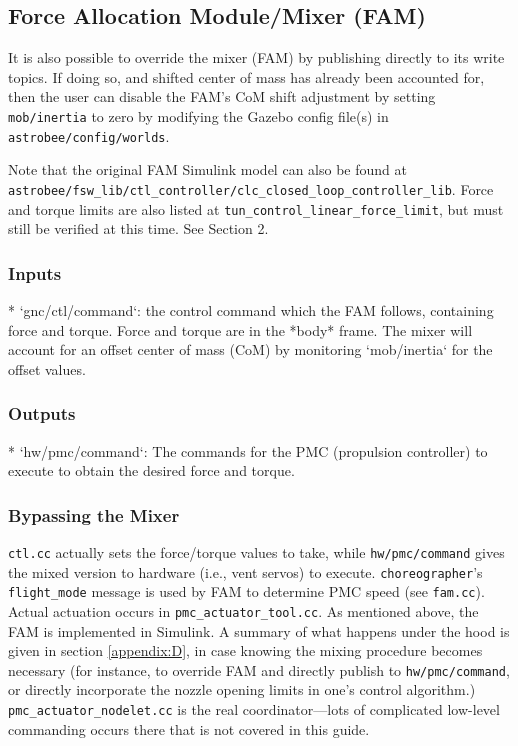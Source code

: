 \documentclass{article}
\begin{document}
\subsection{Force Allocation Module/Mixer (FAM)}

It is also possible to override the mixer (FAM) by publishing directly to its write topics. If doing so, and shifted center of mass has already been accounted for, then the user can disable the FAM's CoM shift adjustment by setting \texttt{mob/inertia}  to zero by modifying the Gazebo config file(s) in \texttt{astrobee/config/worlds}.

Note that the original FAM Simulink model can also be found at\\
\texttt{astrobee/fsw\_lib/ctl\_controller/clc\_closed\_loop\_controller\_lib}.
Force and torque limits are also listed at
\texttt{tun\_control\_linear\_force\_limit}, but must still be verified at this
time. See Section 2.

\subsubsection{Inputs}
\begin{markdown}
* `gnc/ctl/command`: the control command which the FAM follows, containing force and torque. Force and torque are in the *body* frame. The mixer will account for an offset center of mass (CoM) by monitoring `mob/inertia` for the offset values.
\end{markdown}

\subsubsection{Outputs}
\begin{markdown}
* `hw/pmc/command`: The commands for the PMC (propulsion controller) to execute to obtain the desired force and torque.
\end{markdown}

\subsubsection{Bypassing the Mixer}

\texttt{ctl.cc} actually sets the force/torque values to take, while \texttt{hw/pmc/command} gives the mixed version to hardware (i.e., vent servos) to execute. \texttt{choreographer}'s \texttt{flight\_mode} message is used by FAM to determine PMC speed (see \texttt{fam.cc}). Actual actuation occurs in \texttt{pmc\_actuator\_tool.cc}. As mentioned above, the FAM is implemented in Simulink. A summary of what happens under the hood is given in section \ref{appendix:D}, in case knowing the mixing procedure becomes necessary (for instance, to override FAM and directly publish to \texttt{hw/pmc/command}, or directly incorporate the nozzle opening limits in one's control algorithm.) \texttt{pmc\_actuator\_nodelet.cc} is the real coordinator---lots of complicated low-level commanding occurs there that is not covered in this guide.
\end{document}
